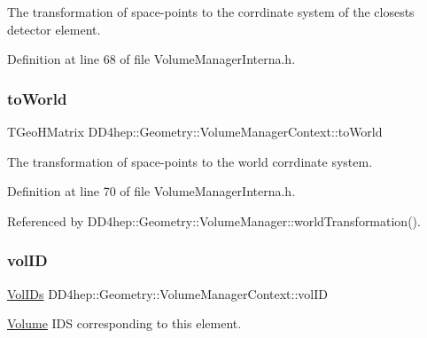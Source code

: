 The transformation of space-\/points to the corrdinate system of the closests detector element. 



Definition at line 68 of file Volume\+Manager\+Interna.\+h.

\hypertarget{class_d_d4hep_1_1_geometry_1_1_volume_manager_context_a724f7f6ffc6fc9e91dca0f07d5f14d1d}{}\label{class_d_d4hep_1_1_geometry_1_1_volume_manager_context_a724f7f6ffc6fc9e91dca0f07d5f14d1d} 
\subsubsection{\texorpdfstring{to\+World}{toWorld}}
{\footnotesize\ttfamily T\+Geo\+H\+Matrix D\+D4hep\+::\+Geometry\+::\+Volume\+Manager\+Context\+::to\+World}



The transformation of space-\/points to the world corrdinate system. 



Definition at line 70 of file Volume\+Manager\+Interna.\+h.



Referenced by D\+D4hep\+::\+Geometry\+::\+Volume\+Manager\+::world\+Transformation().

\hypertarget{class_d_d4hep_1_1_geometry_1_1_volume_manager_context_a3982d4e94fc483caa54382e719eb568c}{}\label{class_d_d4hep_1_1_geometry_1_1_volume_manager_context_a3982d4e94fc483caa54382e719eb568c} 
\subsubsection{\texorpdfstring{vol\+ID}{volID}}
{\footnotesize\ttfamily \hyperlink{class_d_d4hep_1_1_geometry_1_1_volume_manager_context_aedf28d4a226428cfc6ebaabaee0b4c9e}{Vol\+I\+Ds} D\+D4hep\+::\+Geometry\+::\+Volume\+Manager\+Context\+::vol\+ID}



\hyperlink{class_d_d4hep_1_1_geometry_1_1_volume}{Volume} I\+DS corresponding to this element. 



